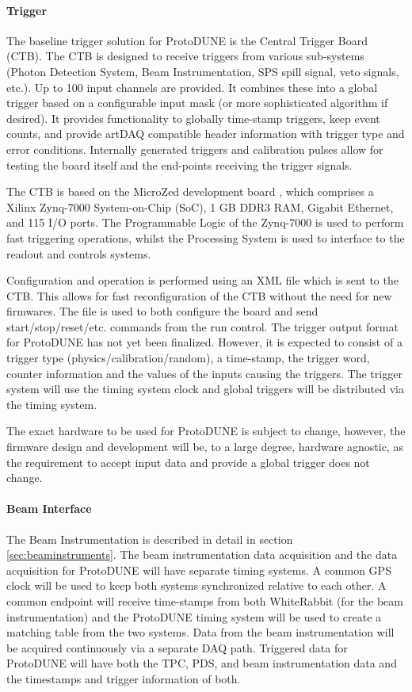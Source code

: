 \paragraph{Trigger}

The baseline trigger solution for ProtoDUNE is the Central Trigger Board
(CTB). The CTB is designed to receive triggers from various sub-systems
(Photon Detection System, Beam Instrumentation, SPS spill signal, veto
signals, etc.).  Up to 100 input channels are provided.  It combines
these into a global trigger based on a configurable input mask (or
more sophisticated algorithm if desired).  It provides functionality
to globally time-stamp triggers, keep event counts, and provide artDAQ
compatible header information with trigger type and error conditions.
Internally generated triggers and calibration pulses allow for testing
the board itself and the end-points receiving the trigger signals.

The CTB is based on the MicroZed development board \cite{avnet:microzed}, which comprises a
Xilinx Zynq-7000 System-on-Chip (SoC), 1 GB DDR3 RAM, Gigabit Ethernet,
and 115 I/O ports.  The Programmable Logic of the Zynq-7000 is used to
perform fast triggering operations, whilst the Processing System is used
to interface to the readout and controls systems.

Configuration and operation is performed using an XML file which is sent
to the CTB.  This allows for fast reconfiguration of the CTB without
the need for new firmwares.  The file is used to both configure the board
and send start/stop/reset/etc. commands from the run control.
The trigger output format for ProtoDUNE has not yet been finalized.  
However, it is expected to consist of a trigger type (physics/calibration/random),
a time-stamp, the trigger word, counter information and the values 
of the inputs causing the triggers.  
The trigger system will use the timing system clock and global triggers will be
distributed via the timing system.  

The exact hardware to be used for ProtoDUNE is subject to change, 
however, the firmware design and development will be, to a large degree, hardware
agnostic, as the requirement to accept input data and provide a global trigger 
does not change.  

\paragraph{Beam Interface}

The Beam Instrumentation is described in detail in section \ref{sec:beaminstruments}.
The beam instrumentation data acquisition and the data acquisition for ProtoDUNE
will have separate timing systems.  A common GPS clock will be used to keep both
systems synchronized relative to each other.  A common endpoint will receive time-stamps 
from both WhiteRabbit (for the beam instrumentation) and the ProtoDUNE timing system
will be used to create a matching table from the two systems.  Data from the beam
instrumentation will be acquired continuously via a separate DAQ path.  Triggered
data for ProtoDUNE will have both the TPC, PDS, and beam instrumentation data and 
the timestamps and trigger information of both.

